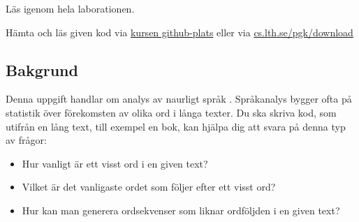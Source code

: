 


\Lab{\LabWeekNINE}
\begin{Goals}

\end{Goals}

\begin{Preparations}
\item {}
\item Läs igenom hela laborationen.
\item Hämta och läs given kod via \href{https://github.com/lunduniversity/introprog/tree/master/workspace/w09_words}{kursen github-plats} eller via \href{https://cs.lth.se/pgk/download/}{cs.lth.se/pgk/download}
\end{Preparations}


\subsection{Bakgrund}

Denna uppgift handlar om analys av naurligt språk . Språkanalys bygger ofta på statistik över förekomsten av olika ord i långa texter. Du ska skriva kod, som utifrån en lång text, till exempel en bok, kan hjälpa dig att svara på denna typ av frågor:
\begin{itemize}[noitemsep]
\item Hur vanligt är ett visst ord i en given text?
\item Vilket är det vanligaste ordet som följer efter ett visst ord?
\item Hur kan man generera ordsekvenser som liknar ordföljden i en given text?
\end{itemize}

